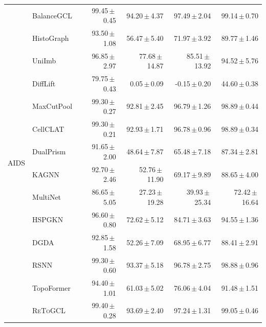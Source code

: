 \documentclass[10pt,twocolumn]{article}
\newcommand{\method}{\textsc{ReToGCL}}
\newcommand{\res}[2]{#1\,$\pm$\,#2}
\begin{document}
\begin{longtable}{@{}llrrrr@{}}
\multirow{14}{*}{AIDS}
& BalanceGCL & \res{99.45}{0.45} & \res{94.20}{4.37} & \res{97.49}{2.04} & \res{99.14}{0.70}\\
& HistoGraph & \res{93.50}{1.08} & \res{56.47}{5.40} & \res{71.97}{3.92} & \res{89.77}{1.46}\\
& UniImb & \res{96.85}{2.97} & \res{77.68}{14.87} & \res{85.51}{13.92} & \res{94.52}{5.76}\\
& DiffLift & \res{79.75}{0.43} & \res{0.05}{0.09} & \res{-0.15}{0.20} & \res{44.60}{0.38}\\
& MaxCutPool & \res{99.30}{0.27} & \res{92.81}{2.45} & \res{96.79}{1.26} & \res{98.89}{0.44}\\
& CellCLAT & \res{99.30}{0.21} & \res{92.93}{1.71} & \res{96.78}{0.96} & \res{98.89}{0.34}\\
& DualPrism & \res{91.65}{2.00} & \res{48.64}{7.87} & \res{65.48}{7.18} & \res{87.34}{2.81}\\
& KAGNN & \res{92.70}{2.46} & \res{52.76}{11.90} & \res{69.17}{9.89} & \res{88.65}{4.00}\\
& MultiNet & \res{86.65}{5.05} & \res{27.23}{19.28} & \res{39.93}{25.34} & \res{72.42}{16.64}\\
& HSPGKN & \res{96.60}{0.80} & \res{72.62}{5.12} & \res{84.71}{3.63} & \res{94.55}{1.36}\\
& DGDA & \res{92.85}{1.58} & \res{52.26}{7.09} & \res{68.95}{6.77} & \res{88.41}{2.91}\\
& RSNN & \res{99.30}{0.60} & \res{93.37}{5.18} & \res{96.78}{2.75} & \res{98.88}{0.96}\\
& TopoFormer & \res{94.40}{1.01} & \res{61.03}{5.02} & \res{76.06}{4.04} & \res{91.48}{1.51}\\
\rowcolor{topologypurple!45}& \method{} & \res{99.40}{0.28} & \res{93.69}{2.40} & \res{97.24}{1.31} & \res{99.05}{0.46}\\
\midrule


\end{longtable}
\end{document}
